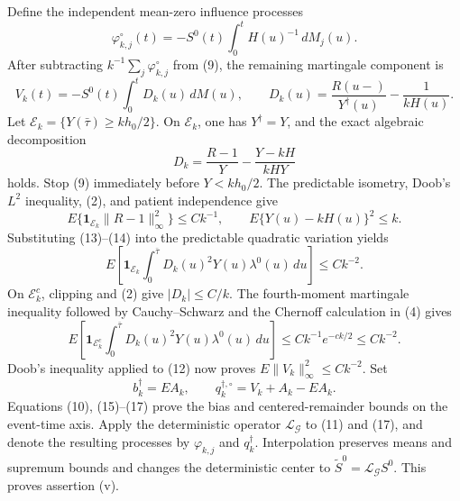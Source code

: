 Define the independent mean-zero influence processes
\[
 \varphi_{k,j}^{\circ}(t)
 =-S^0(t)\int_0^tH(u)^{-1}\,dM_j(u).                    \tag{11}
\]
After subtracting \(k^{-1}\sum_j\varphi_{k,j}^{\circ}\) from (9), the
remaining martingale component is
\[
 V_k(t)=-S^0(t)\int_0^tD_k(u)\,dM(u),
 \qquad
 D_k(u)=\frac{R(u-)}{Y^\dagger(u)}-\frac{1}{kH(u)}.      \tag{12}
\]
Let \(\mathcal E_k=\{Y(\bar\tau)\geq kh_0/2\}\).  On
\(\mathcal E_k\), one has \(Y^\dagger=Y\), and the exact algebraic
decomposition
\[
 D_k
 =\frac{R-1}{Y}-\frac{Y-kH}{kHY}                       \tag{13}
\]
holds.  Stop (9) immediately before \(Y<kh_0/2\).  The predictable
isometry, Doob's \(L^2\) inequality, (2), and patient independence give
\[
 E\{\mathbf 1_{\mathcal E_k}\|R-1\|_\infty^2\}
 \leq Ck^{-1},
 \qquad
 E\{Y(u)-kH(u)\}^2\leq k.                               \tag{14}
\]
Substituting (13)--(14) into the predictable quadratic variation yields
\[
 E\left[\mathbf 1_{\mathcal E_k}
 \int_0^{\bar\tau}D_k(u)^2Y(u)\lambda^0(u)\,du\right]
 \leq Ck^{-2}.                                           \tag{15}
\]
On \(\mathcal E_k^c\), clipping and (2) give
\(|D_k|\leq C/k\).  The fourth-moment martingale inequality followed by
Cauchy--Schwarz and the Chernoff calculation in (4) gives
\[
 E\left[\mathbf 1_{\mathcal E_k^c}
 \int_0^{\bar\tau}D_k(u)^2Y(u)\lambda^0(u)\,du\right]
 \leq Ck^{-1}e^{-ck/2}\leq Ck^{-2}.                     \tag{16}
\]
Doob's inequality applied to (12) now proves
\(E\|V_k\|_\infty^2\leq Ck^{-2}\).  Set
\[
 b_k^\dagger=EA_k,
 \qquad q_k^{\dagger,\circ}=V_k+A_k-EA_k.               \tag{17}
\]
Equations (10), (15)--(17) prove the bias and centered-remainder bounds on
the event-time axis.  Apply the deterministic operator
\(\mathcal L_{\mathcal G}\) to (11) and (17), and denote the resulting
processes by \(\varphi_{k,j}\) and \(q_k^\dagger\).  Interpolation preserves
means and supremum bounds and changes the deterministic center to
\(\widetilde S^0=\mathcal L_{\mathcal G}S^0\).  This proves assertion (v).

